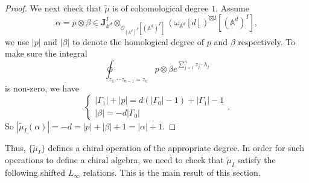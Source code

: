 \documentclass[11pt]{amsart}
\theoremstyle{definition}
\theoremstyle{remark}
\numberwithin{equation}{section}
\begin{document}
\begin{proof}
    We next check that $\tilde{\mu}$ is of cohomological degree $1$. 
    Assume
    $$
    \alpha=p\otimes\beta\in\mathbf{J}^{ I}_{\mathbb{A}^{d}}\otimes_{\mathcal{O}_{(\mathbb{A}^{d})^{ I}}[(\mathbb{A}^{d})^{ I}]}(\omega_{\mathbb{A}^{d}}[d])^{\boxtimes I}[(\mathbb{A}^{d})^{ I}],
    $$
    we use $|p|$ and $|\beta|$ to denote the homological degree of $p$ and $\beta$ respectively. To make sure the integral
    $$
    \oint_{z_{1},\cdots z_{n-1}=z_{n}}p\otimes\beta e^{\sum_{j=1}^{n}z_{j}\cdot \lambda_{j}}
    $$
    is non-zero, we have
    $$
    \begin{cases}
        |\Gamma_{1}|+|p|=d(|\Gamma_{0}|-1)+|\Gamma_{1}|-1\\
        |\beta|=-d|\Gamma_{0}|
    \end{cases}.
    $$
    So $|\tilde{\mu}_{ I}(\alpha)|=-d=|p|+|\beta|+1=|\alpha|+1$.
\end{proof}


Thus, $\{\tilde \mu_I\}$ defines a chiral operation of the appropriate degree.
In order for such operations to define a chiral algebra, we need to check that $\tilde{\mu}_{ I}$ satisfy the following shifted $L_{\infty}$ relations.
This is the main result of this section.
\end{document}
